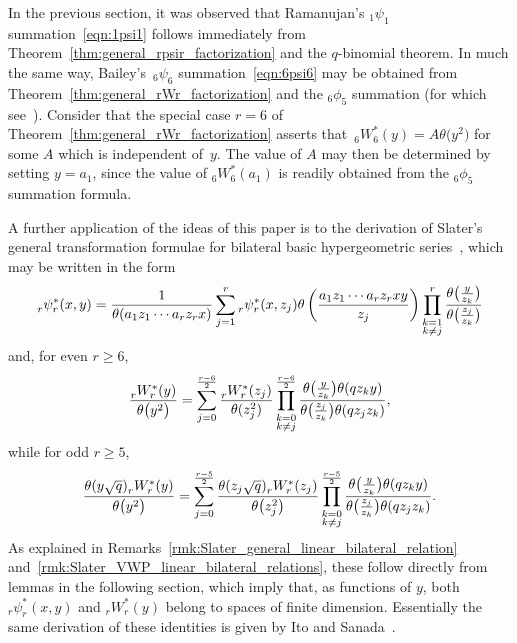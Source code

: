 \documentclass[10pt,a4paper]{amsart}
\numberwithin{equation}{section}
\begin{document}
In the previous section, it was observed that Ramanujan's $_1\psi_1$ summation~\eqref{eqn:1psi1} follows immediately from Theorem~\ref{thm:general_rpsir_factorization} and the $q$-binomial theorem. In much the same way, Bailey's~$_6\psi_6$ summation~\eqref{eqn:6psi6} may be obtained from Theorem~\ref{thm:general_rWr_factorization} and the $_6\phi_5$ summation (for which see~\cite[equation~(2.7.1)]{Gasper2004}). Consider that the special case $r=6$ of Theorem~\ref{thm:general_rWr_factorization} asserts that~${_6W_6^\ast(y) = A \theta\bigl(y^2\bigr)}$ for some $A$ which is independent of~$y$. The value of $A$ may then be determined by setting $y=a_1$, since the value of $_6W_6^\ast(a_1)$ is readily obtained from the $_6\phi_5$ summation formula.

A further application of the ideas of this paper is to the derivation of Slater's general transformation formulae for bilateral basic hypergeometric series~\cite{Slater1952}, which may be written in the form
\begin{equation} \label{eqn:Slater_general_linear_bilateral_relation}
_r^{}\psi_r^\ast(x,y) = {1 \over \theta(a_1z_1\cdots a_r z_r x)} \sum_{j=1}^r {}_r^{}\psi_r^\ast(x,z_j) \theta \left({a_1z_1\cdots a_r z_r xy \over z_j} \right) \prod_{\substack{k=1 \\ k \neq j}}^r {\theta\bigl({y \over z_k}\bigr) \over \theta\bigl({z_j \over z_k}\bigr)}
\end{equation}
and, for even $r \geq 6$,
\begin{equation} \label{Slater_VWP_linear_bilateral_relation_even}
{_r^{}W_r^\ast(y) \over \theta\bigl(y^2\bigr)} = \sum_{j=0}^{r-6 \over 2} {_r^{}W_r^\ast(z_j) \over \theta(z_j^2)} \prod_{\substack{k=0 \\ k \neq j}}^{r-6 \over 2} {\theta\bigl({y \over z_k}\bigr) \theta(qz_ky) \over \theta\bigl({z_j \over z_k}\bigr) \theta(qz_jz_k)},
\end{equation}
while for odd $r \geq 5$,
\begin{equation} \label{Slater_VWP_linear_bilateral_relation_odd}
{\theta(y\sqrt{q}) {}_r^{}W_r^\ast(y) \over \theta\bigl(y^2\bigr)} = \sum_{j=0}^{r-5 \over 2} {\theta(z_j\sqrt{q}) {}_r^{}W_r^\ast(z_j) \over \theta\bigl(z_j^2\bigr)} \prod_{\substack{k=0 \\ k \neq j}}^{r-5 \over 2} {\theta\bigl({y \over z_k}\bigr) \theta(qz_ky) \over \theta\bigl({z_j \over z_k}\bigr) \theta(qz_jz_k)}.
\end{equation}
As explained in Remarks~\ref{rmk:Slater_general_linear_bilateral_relation} and~\ref{rmk:Slater_VWP_linear_bilateral_relations}, these follow directly from lemmas in the following section, which imply that, as functions of $y$, both $_r^{}\psi_r^\ast(x,y)$ and $_r^{}W_r^\ast(y)$ belong to spaces of finite dimension. Essentially the same derivation of these identities is given by Ito and Sanada~\cite[Section~3.1]{Ito2008}.
\end{document}
